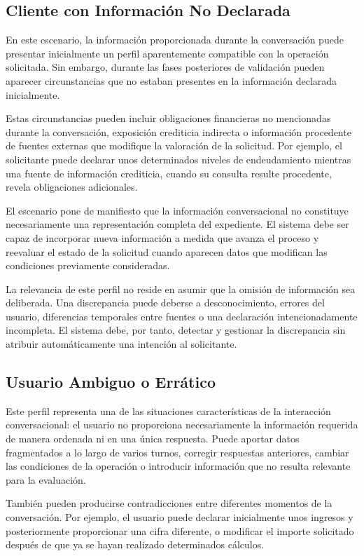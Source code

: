 \documentclass[12pt,a4paper]{report}
\begin{document}
\subsection{Cliente con Información No Declarada}

En este escenario, la información proporcionada durante la conversación puede presentar inicialmente un perfil aparentemente compatible con la operación solicitada. Sin embargo, durante las fases posteriores de validación pueden aparecer circunstancias que no estaban presentes en la información declarada inicialmente.

Estas circunstancias pueden incluir obligaciones financieras no mencionadas durante la conversación, exposición crediticia indirecta o información procedente de fuentes externas que modifique la valoración de la solicitud. Por ejemplo, el solicitante puede declarar unos determinados niveles de endeudamiento mientras una fuente de información crediticia, cuando su consulta resulte procedente, revela obligaciones adicionales.

El escenario pone de manifiesto que la información conversacional no constituye necesariamente una representación completa del expediente. El sistema debe ser capaz de incorporar nueva información a medida que avanza el proceso y reevaluar el estado de la solicitud cuando aparecen datos que modifican las condiciones previamente consideradas.

La relevancia de este perfil no reside en asumir que la omisión de información sea deliberada. Una discrepancia puede deberse a desconocimiento, errores del usuario, diferencias temporales entre fuentes o una declaración intencionadamente incompleta. El sistema debe, por tanto, detectar y gestionar la discrepancia sin atribuir automáticamente una intención al solicitante.

\subsection{Usuario Ambiguo o Errático}

Este perfil representa una de las situaciones características de la interacción conversacional: el usuario no proporciona necesariamente la información requerida de manera ordenada ni en una única respuesta. Puede aportar datos fragmentados a lo largo de varios turnos, corregir respuestas anteriores, cambiar las condiciones de la operación o introducir información que no resulta relevante para la evaluación.

También pueden producirse contradicciones entre diferentes momentos de la conversación. Por ejemplo, el usuario puede declarar inicialmente unos ingresos y posteriormente proporcionar una cifra diferente, o modificar el importe solicitado después de que ya se hayan realizado determinados cálculos.
\end{document}
